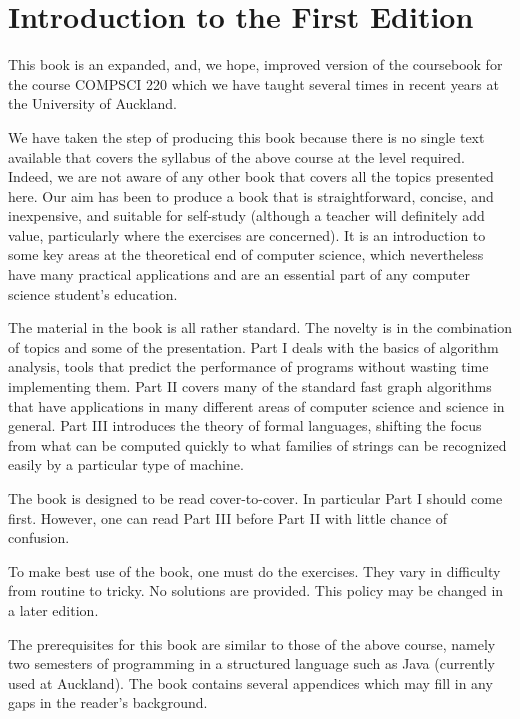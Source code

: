 \chapter*{Introduction to the First Edition}

This book is an expanded, and, we hope, improved version of the coursebook
for the course COMPSCI 220 which we have taught several times in recent
years at the University of Auckland.

We have taken the step of producing this book because there is no single
text available that covers the syllabus of the above course at the level
required. Indeed, we are not aware of any other book that covers all
the topics presented here. Our aim has been to produce a book that is
straightforward, concise, and inexpensive, and suitable for self-study
(although a teacher will definitely add value, particularly where the
exercises are concerned). It is an introduction to some key areas at
the theoretical end of computer science, which nevertheless have many
practical applications and are an essential part of any computer science
student's education.

The material in the book is all rather standard. The novelty is in the
combination of topics and some of the presentation. Part I deals with
the basics of algorithm analysis, tools that predict the performance of
programs without wasting time implementing them. Part II covers many
of the standard fast graph algorithms that have applications in many
different areas of computer science and science in general. Part III
introduces the theory of formal languages, shifting the focus from what can
be computed quickly to what families of strings can be recognized
easily by a particular type of machine.

The book is designed to be read cover-to-cover. In particular Part I
should come first. However, one can read Part III before Part II with 
little chance of confusion.

To make best use of the book, one must do the exercises. They vary in
difficulty from routine to tricky. No solutions are provided. This policy
may be changed in a later edition.

The  prerequisites for this book are similar to those of the above course,
namely two semesters of programming in a structured language such as Java
(currently used at Auckland). The book contains several appendices which
may fill in any gaps in the reader's background.

